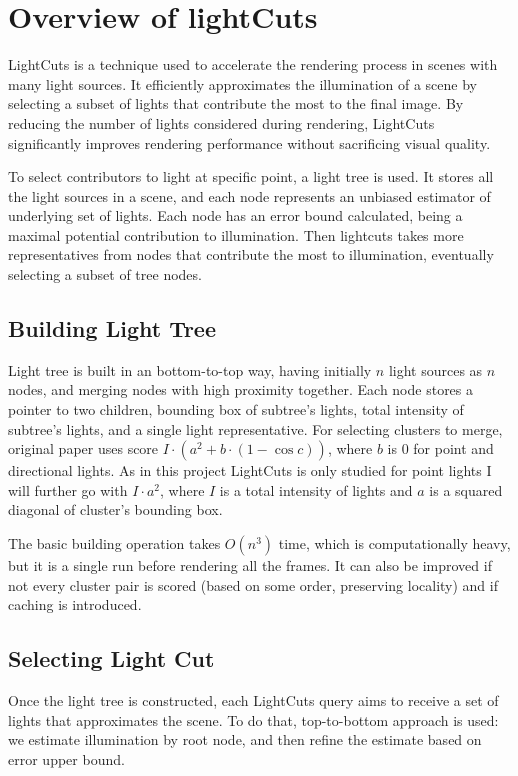 \documentclass[twocolumn]{article}
\begin{document}
\section{Overview of lightCuts}

LightCuts is a technique used to accelerate the rendering process in scenes with many light sources.
It efficiently approximates the illumination of a scene by selecting a subset of lights that contribute the most to the final image.
By reducing the number of lights considered during rendering, LightCuts significantly improves rendering performance without sacrificing visual quality.

To select contributors to light at specific point, a light tree is used.
It stores all the light sources in a scene, and each node represents an unbiased estimator of underlying set of lights.
Each node has an error bound calculated, being a maximal potential contribution to illumination.
Then lightcuts takes more representatives from nodes that contribute the most to illumination, eventually selecting a subset of tree nodes.

\subsection{Building Light Tree}

Light tree is built in an bottom-to-top way, having initially $n$ light sources as $n$ nodes, and merging nodes with high proximity together.
Each node stores a pointer to two children, bounding box of subtree's lights, total intensity of subtree's lights, and a single light representative.
For selecting clusters to merge, original paper uses score $I \cdot (a^2 + b \cdot (1 - \cos c))$, where $b$ is 0 for point and directional lights.
As in this project LightCuts is only studied for point lights I will further go with $I \cdot a^2$, where $I$ is a total intensity of lights and $a$ is a squared diagonal of cluster's bounding box.

The basic building operation takes $O(n^3)$ time, which is computationally heavy, but it is a single run before rendering all the frames.
It can also be improved if not every cluster pair is scored (based on some order, preserving locality) and if caching is introduced.

\subsection{Selecting Light Cut}
Once the light tree is constructed, each LightCuts query aims to receive a set of lights that approximates the scene.
To do that, top-to-bottom approach is used: we estimate illumination by root node, and then refine the estimate based on error upper bound.
\end{document}
